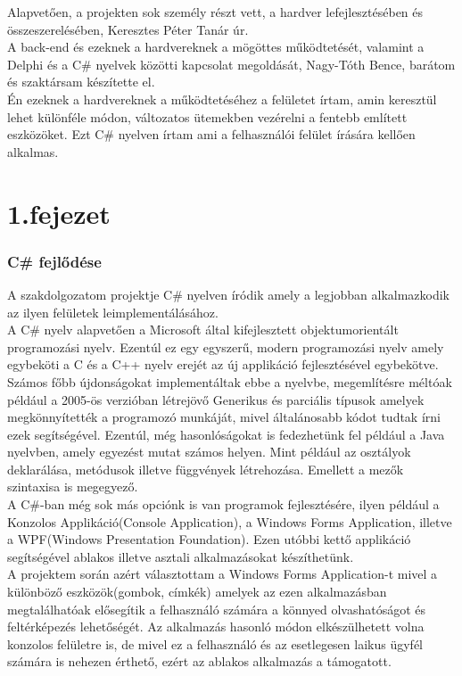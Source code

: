 \documentclass[tocnopagenum]{thesis-ekf}
\theoremstyle{definition}
\theoremstyle{remark}
\begin{document}

	Alapvetően, a projekten sok személy részt vett, a hardver lefejlesztésében és 
	összeszerelésében, Keresztes Péter Tanár úr. \\
	A back-end és ezeknek a hardvereknek a mögöttes működtetését, valamint a Delphi és a C\# nyelvek közötti kapcsolat megoldását, Nagy-Tóth Bence, barátom és szaktársam készítette el.
	\\
	Én ezeknek a hardvereknek a működtetéséhez a felületet írtam, amin keresztül lehet különféle módon, változatos ütemekben vezérelni a fentebb említett eszközöket. Ezt C\# nyelven írtam ami a felhasználói felület írására kellően alkalmas.
	
	

	\chapter*{1.fejezet}
	\subsection{C\# fejlődése}
	A szakdolgozatom projektje C\# nyelven íródik amely a legjobban alkalmazkodik az ilyen felületek leimplementálásához. \\
	A C\# nyelv alapvetően a Microsoft által kifejlesztett objektumorientált programozási nyelv.
	Ezentúl ez egy egyszerű, modern programozási nyelv amely egybeköti a C és a C++ nyelv erejét az új applikáció fejlesztésével egybekötve. \cite{hejlsberg2003c}
	\\ 
	Számos főbb újdonságokat implementáltak ebbe a nyelvbe, megemlítésre méltóak például a 2005-ös verzióban létrejövő Generikus és parciális típusok amelyek megkönnyítették a programozó munkáját, mivel általánosabb kódot tudtak írni ezek segítségével.
	Ezentúl, még hasonlóságokat is fedezhetünk fel például a Java nyelvben, amely egyezést mutat számos helyen.
	Mint például az osztályok deklarálása, metódusok illetve függvények létrehozása. Emellett a mezők szintaxisa is megegyező.
	\\
	A C\#-ban még sok más opciónk is van programok fejlesztésére, ilyen például a Konzolos Applikáció(Console Application), a Windows Forms Application, illetve a WPF(Windows Presentation Foundation). Ezen utóbbi kettő applikáció segítségével ablakos illetve asztali alkalmazásokat készíthetünk.
	\\
	A projektem során azért választottam a Windows Forms Application-t mivel a különböző eszközök(gombok, címkék) amelyek az ezen alkalmazásban megtalálhatóak elősegítik a felhasználó számára a könnyed olvashatóságot és feltérképezés lehetőségét. Az alkalmazás hasonló módon elkészülhetett volna konzolos felületre is, de mivel ez a felhasználó és az esetlegesen laikus ügyfél számára is nehezen érthető, ezért az ablakos alkalmazás a támogatott.
	\\ 
\end{document}
